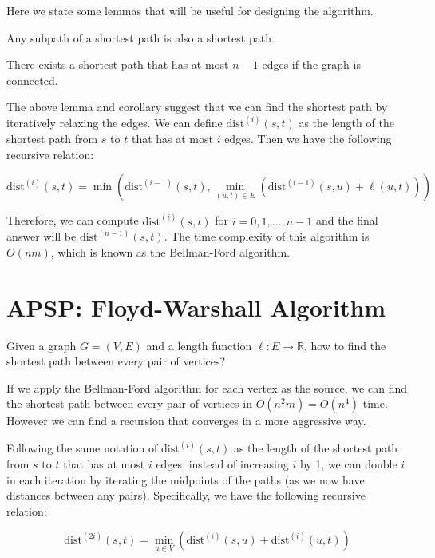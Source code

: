 Here we state some lemmas that will be useful for designing the algorithm.

\begin{lemma}
	\label{lemma:shortest-path-subpath}
	Any subpath of a shortest path is also a shortest path.
\end{lemma}

\begin{corollary}
	\label{corollary:shortest-path-simple}
	There exists a shortest path that has at most $n-1$ edges if the graph is connected.
\end{corollary}

The above lemma and corollary suggest that we can find the shortest path by iteratively relaxing the edges. We can define $\text{dist}^{(i)}(s, t)$ as the length of the shortest path from $s$ to $t$ that has at most $i$ edges. Then we have the following recursive relation:

\[ \text{dist}^{(i)}(s, t) = \min\left( \text{dist}^{(i-1)}(s, t), \min_{(u, t) \in E} (\text{dist}^{(i-1)}(s, u) + \ell(u, t)) \right) \]

Therefore, we can compute $\text{dist}^{(i)}(s, t)$ for $i = 0, 1, \ldots, n-1$ and the final answer will be $\text{dist}^{(n-1)}(s, t)$. The time complexity of this algorithm is $O(nm)$, which is known as the Bellman-Ford algorithm.

\section{APSP: Floyd-Warshall Algorithm}

\begin{problem}
Given a graph $G = (V, E)$ and a length function $\ell: E \to \mathbb{R}$, how to find the shortest path between every pair of vertices?
\end{problem}

If we apply the Bellman-Ford algorithm for each vertex as the source, we can find the shortest path between every pair of vertices in $O(n^2 m) = O(n^4)$ time. However we can find a recursion that converges in a more aggressive way.

Following the same notation of $\text{dist}^{(i)}(s, t)$ as the length of the shortest path from $s$ to $t$ that has at most $i$ edges, instead of increasing $i$ by 1, we can double $i$ in each iteration by iterating the midpoints of the paths (as we now have distances between any pairs). Specifically, we have the following recursive relation:

\[ \text{dist}^{(2i)}(s, t) = \min_{u \in V} (\text{dist}^{(i)}(s, u) + \text{dist}^{(i)}(u, t)) \]

